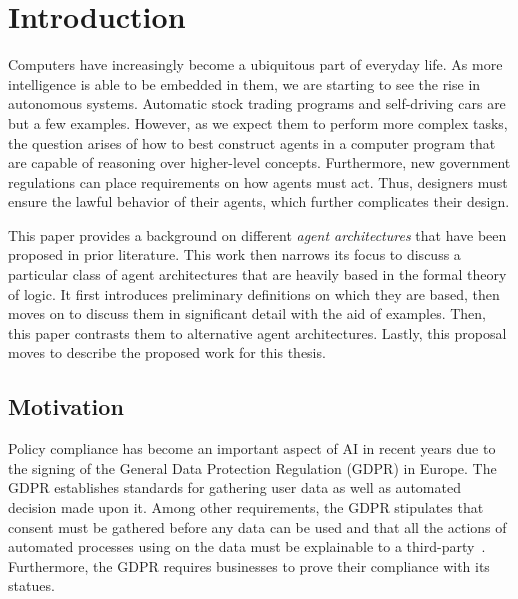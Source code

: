 \chapter{Introduction}

%
%

Computers have increasingly become a ubiquitous part of everyday life.
As more intelligence is able to be embedded in them, we are starting to see the rise in autonomous systems.
Automatic stock trading programs and self-driving cars are but a few examples.
However, as we expect them to perform more complex tasks, the question arises of how to best construct agents in a computer program that are capable of reasoning over higher-level concepts.
Furthermore, new government regulations can place requirements on how agents must act.
Thus, designers must ensure the lawful behavior of their agents, which further complicates their design.

This paper provides a background on different \textit{agent architectures} that have been proposed in prior literature.
This work then narrows its focus to discuss a particular class of agent architectures that are heavily based in the formal theory of logic.
It first introduces preliminary definitions on which they are based, then moves on to discuss them in significant detail with the aid of examples.
Then, this paper contrasts them to alternative agent architectures.
Lastly, this proposal moves to describe the proposed work for this thesis.

\section{Motivation}

Policy compliance has become an important aspect of AI in recent years due to the signing of the General Data Protection Regulation (GDPR) in Europe.
The GDPR establishes standards for gathering user data as well as automated decision made upon it.
Among other requirements, the GDPR stipulates that consent must be gathered before any data can be used and that all the actions of automated processes using on the data must be explainable to a third-party~\citep{sandra_wachter_artificial_2018}.
Furthermore, the GDPR requires businesses to prove their compliance with its statues.

